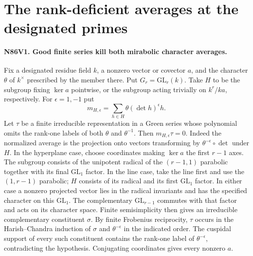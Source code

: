 \section{The rank-deficient averages at the designated primes}

\paragraph{N86V1. Good finite series kill both mirabolic character averages.}
Fix a designated residue field $k$, a nonzero vector or covector $a$,
and the character $\theta$ of $k^\times$ prescribed by the member
there. Put $G_r=\mathrm{GL}_r(k)$. Take $H$ to be the subgroup
fixing $\ker a$ pointwise, or the subgroup acting trivially on
$k^r/ka$, respectively. For $\epsilon=1,-1$ put
\[
        m_{H,\epsilon}=\sum_{h\in H}\theta(\det h)^\epsilon h.
\]
Let $\tau$ be a finite irreducible representation in a Green
series whose polynomial omits the rank-one labels of both $\theta$
and $\theta^{-1}$. Then $m_{H,\epsilon}\tau=0$.
Indeed the normalized average is the projection onto vectors
transforming by $\theta^{-\epsilon}\circ\det$ under $H$.
In the hyperplane case, choose coordinates making $\ker a$ the first
$r-1$ axes. The subgroup consists of the unipotent radical of the
$(r-1,1)$ parabolic together with its final $\mathrm{GL}_1$ factor.
In the line case, take the line first and use the $(1,r-1)$ parabolic;
$H$ consists of its radical and its first $\mathrm{GL}_1$ factor.
In either case a nonzero projected vector lies in the radical
invariants and has the specified character on this $\mathrm{GL}_1$.
The complementary $\mathrm{GL}_{r-1}$ commutes with that factor
and acts on its character space. Finite semisimplicity then gives an
irreducible complementary constituent $\sigma$. By finite Frobenius
reciprocity, $\tau$ occurs in the Harish--Chandra induction of
$\sigma$ and $\theta^{-\epsilon}$ in the indicated order.
The cuspidal support of every such constituent contains the
rank-one label of $\theta^{-\epsilon}$, contradicting the
hypothesis. Conjugating coordinates gives every nonzero $a$.


